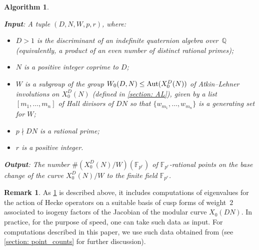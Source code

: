 \documentclass[11pt,reqno]{amsart}
\newcommand{\F}{\mathbb{F}}
\newcommand{\Q}{\mathbb{Q}}
\newcommand{\C}{\mathbb{C}}
\newcommand{\Aut}{{\rm Aut}}
\newtheorem{algorithm}[theorem]{Algorithm}
\theoremstyle{definition}
\newtheorem{remark}[theorem]{Remark}
\newcommand{\Pietro}[1]{{\color{orange}{??Pietro: #1}}} %
\newcommand{\freddy}[1]{{\color{purple}{$\spadesuit$ Freddy: #1}}}
\begin{document}
\begin{algorithm}\label{algorithm: introduction_version}
\phantom{space} \vspace{0.5em}

\textnormal{\textbf{Input}}: A tuple $(D,N,W,p,r)$, where:
\begin{itemize}
    \item $D>1$ is the discriminant of an indefinite quaternion algebra over~$\Q$ (equivalently, a product of an even number of distinct rational primes);
    \item $N$ is a positive integer coprime to $D$;
    \item $W$ is a subgroup of the group $W_0(D,N) \leq \Aut(X_0^D(N))$ %
    of Atkin--Lehner involutions on $X_0^D(N)$ (defined in \cref{section: AL}), given by a list $[m_1, \ldots, m_n]$ of Hall divisors of $DN$ so that $\{w_{m_1}, \ldots, w_{m_n}\}$ is a generating set for $W$;
    \item $p \nmid DN$ is a rational prime;
    \item $r$ is a positive integer.
\end{itemize}

\textnormal{\textbf{Output}}: The number $\#\left(X_0^D(N)/W\right)\left(\F_{p^r}\right)$ of $\F_{p^r}$-rational points on the base change of the curve $X_0^D(N)/W$ to the finite field $\F_{p^r}$. 
\end{algorithm}

\begin{remark}
As \cref{algorithm: introduction_version} is described above, it includes computations of eigenvalues for the action of Hecke operators on a suitable basis of cusp forms of weight~$2$ associated to isogeny factors of the Jacobian of the modular curve $X_0(DN)$. In practice, for the purpose of speed, one can take such data as input. For computations described in this paper, we use such data obtained from \cite{LMFDB} (see \cref{section: point_counts} for further discussion). 
\end{remark}
\end{document}
